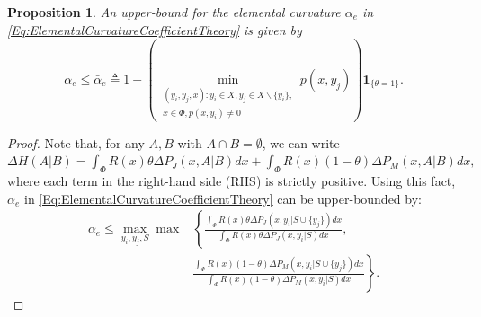 \documentclass[letterpaper, 10 pt, conference]{ieeeconf}
\newcommand{\mb}[1]{\mathbf{#1}}
\newtheorem{proposition}{Proposition}
\begin{document}
\begin{proposition}
\label{Pr:ElementalCurvatureBound}
An upper-bound for the elemental curvature $\alpha_e$ in \eqref{Eq:ElementalCurvatureCoefficientTheory} is given by 
\begin{equation}\label{Eq:Pr:ElementalCurvatureBound}
\alpha_e \leq \bar{\alpha}_e \triangleq
1-\left(\min_{\substack{(y_i,y_j,x):y_i\in X, y_j \in X\backslash\{y_i\},\\x\in \Phi, p(x,y_i) \neq 0}} p(x,y_j)\right)\mb{1}_{\{\theta =1\}}.
\end{equation}
\end{proposition}
\begin{proof}
Note that, for any $A,B$ with $A\cap B = \emptyset$, we can write 
$\Delta H(A \vert B) = \int_\Phi R(x) \theta \Delta P_J(x, A \vert B) dx + \int_\Phi R(x) (1-\theta) \Delta P_M(x,A \vert B) dx,$
where each term in the right-hand side (RHS) is strictly positive. Using this fact, $\alpha_e$ in \eqref{Eq:ElementalCurvatureCoefficientTheory} can be upper-bounded by:
\begin{align}
\alpha_e \leq \max_{y_i,y_j,S}\max &\left\{ \frac{\int_\Phi R(x)\theta \Delta P_J(x,y_i\vert S\cup \{y_j\})dx}
{\int_\Phi R(x)\theta \Delta P_J(x,y_i\vert S)dx},\nonumber \right.\\
\label{Eq:Pr:ElementalCurvatureBoundStep1}
&\left. 
\frac{\int_\Phi R(x)(1-\theta) \Delta P_M(x,y_i\vert S\cup \{y_j\})dx}
{\int_\Phi R(x)(1-\theta) \Delta P_M(x,y_i\vert S)dx} \right\}.    
\end{align}


\end{proof}
\end{document}
